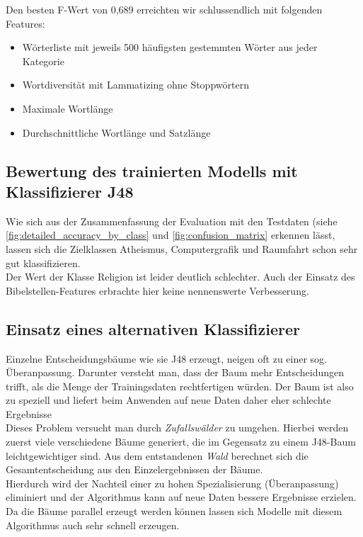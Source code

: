 \documentclass[
	11pt,
	a4paper
]{scrartcl}
\begin{document}
Den besten F-Wert von 0,689 erreichten wir schlussendlich mit folgenden Features:
\begin{itemize}[itemsep=0pt,parsep=0pt, topsep=0pt]
	\item Wörterliste mit jeweils 500 häufigsten gestemmten Wörter aus jeder Kategorie
	\item Wortdiversität mit Lammatizing ohne Stoppwörtern
	\item Maximale Wortlänge
	\item Durchschnittliche Wortlänge und Satzlänge
\end{itemize}

\subsection{Bewertung des trainierten Modells mit Klassifizierer J48}
Wie sich aus der Zusammenfassung der Evaluation mit den Testdaten (siehe \autoref{fig:detailed_accuracy_by_class} und
\autoref{fig:confusion_matrix} erkennen lässt, lassen sich die Zielklassen Atheismus, Computergrafik und Raumfahrt schon sehr gut
klassifizieren.\\
Der Wert der Klasse Religion ist leider deutlich schlechter. Auch der Einsatz des Bibelstellen-Features erbrachte hier keine nennenswerte
Verbesserung.

\subsection{Einsatz eines alternativen Klassifizierer}
Einzelne Entscheidungsbäume wie sie J48 erzeugt, neigen oft zu einer sog. Überanpassung. Darunter versteht man, dass der
Baum mehr Entscheidungen trifft, als die Menge der Trainingsdaten rechtfertigen würden. Der Baum ist also zu speziell und liefert beim
Anwenden auf neue Daten daher eher schlechte Ergebnisse\\

Dieses Problem versucht man durch \emph{Zufallswälder} zu umgehen. Hierbei werden zuerst viele verschiedene Bäume generiert, die im
Gegensatz zu einem J48-Baum leichtgewichtiger sind. Aus dem entstandenen \emph{Wald} berechnet sich die Gesamtentscheidung aus den
Einzelergebnissen der Bäume.\\
Hierdurch wird der Nachteil einer zu hohen Spezialisierung (Überanpassung) eliminiert und der
Algorithmus kann auf neue Daten bessere Ergebnisse erzielen.\\
Da die Bäume parallel erzeugt werden können lassen sich Modelle mit diesem Algorithmus auch sehr schnell erzeugen.\\
\end{document}
